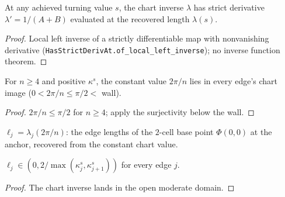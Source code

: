 \begin{lemma}
  \label{lem:has_strict_deriv_at_chart_inv}
  At any achieved turning value $s$, the chart inverse $\lambda$ has strict
  derivative $\lambda' = 1/(A + B)$ evaluated at the recovered length
  $\lambda(s)$.
\end{lemma}
\begin{proof}

\leanok
  Local left inverse of a strictly differentiable map with nonvanishing
  derivative (\texttt{HasStrictDerivAt.of\_local\_left\_inverse}); no inverse
  function theorem.
\end{proof}

\begin{lemma}
  \label{lem:base_chart_mem_image}
  For $n \ge 4$ and positive $\kappa^s$, the constant value $2\pi/n$ lies in
  every edge's chart image ($0 < 2\pi/n \le \pi/2 <$ wall).
\end{lemma}
\begin{proof}

\leanok
  $2\pi/n \le \pi/2$ for $n \ge 4$; apply the surjectivity below the wall.
\end{proof}

\begin{definition}
  \label{def:jacobian_base_len}
  $\ell_j = \lambda_j(2\pi/n)$: the edge lengths of the $2$-cell base point
  $\Phi(0,0)$ at the anchor, recovered from the constant chart value.
\end{definition}

\begin{lemma}
  \label{lem:jacobian_base_len_mem}
  $\ell_j \in (0, 2/\max(\kappa^s_j, \kappa^s_{j+1}))$ for every edge $j$.
\end{lemma}
\begin{proof}

\leanok
  The chart inverse lands in the open moderate domain.
\end{proof}


